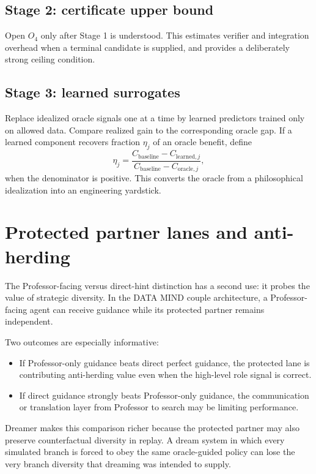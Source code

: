 \documentclass[11pt]{article}
\begin{document}
\subsection*{Stage 2: certificate upper bound}
Open $O_4$ only after Stage 1 is understood. This estimates verifier and integration overhead when a terminal candidate is supplied, and provides a deliberately strong ceiling condition.

\subsection*{Stage 3: learned surrogates}
Replace idealized oracle signals one at a time by learned predictors trained only on allowed data. Compare realized gain to the corresponding oracle gap. If a learned component recovers fraction $\eta_j$ of an oracle benefit, define
\begin{equation}
\eta_j=
\frac{C_{\mathrm{baseline}}-C_{\mathrm{learned},j}}
{C_{\mathrm{baseline}}-C_{\mathrm{oracle},j}},
\end{equation}
when the denominator is positive. This converts the oracle from a philosophical idealization into an engineering yardstick.

\section{Protected partner lanes and anti-herding}

The Professor-facing versus direct-hint distinction has a second use: it probes the value of strategic diversity. In the DATA MIND couple architecture, a Professor-facing agent can receive guidance while its protected partner remains independent.

Two outcomes are especially informative:
\begin{itemize}
\item If Professor-only guidance beats direct perfect guidance, the protected lane is contributing anti-herding value even when the high-level role signal is correct.
\item If direct guidance strongly beats Professor-only guidance, the communication or translation layer from Professor to search may be limiting performance.
\end{itemize}

Dreamer makes this comparison richer because the protected partner may also preserve counterfactual diversity in replay. A dream system in which every simulated branch is forced to obey the same oracle-guided policy can lose the very branch diversity that dreaming was intended to supply.
\end{document}
